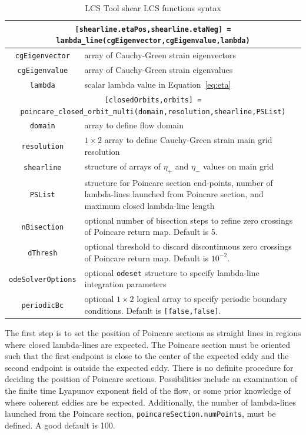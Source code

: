\documentclass{article}
\begin{document}
\begin{table}
\begin{tabular}{|c|p{}|}
\hline \hline
\multicolumn{2}{|p{\textwidth}|}{\lstinline![shearline.etaPos,shearline.etaNeg] = lambda_line(cgEigenvector,cgEigenvalue,lambda)!}\\
\hline
\lstinline!cgEigenvector! & array of Cauchy-Green strain eigenvectors\\
\hline
\lstinline!cgEigenvalue! & array of Cauchy-Green strain eigenvalues\\
\hline
\lstinline!lambda! & scalar lambda value in Equation~\eqref{eq:eta}\\
\hline \hline
\multicolumn{2}{|p{\textwidth}|}{\lstinline![closedOrbits,orbits] = poincare_closed_orbit_multi(domain,resolution,shearline,PSList)!}\\
\hline
\lstinline!domain! & array to define flow domain\\
\hline
\lstinline!resolution! & $1 \times 2$ array to define Cauchy-Green strain main grid resolution\\
\hline
\lstinline!shearline! & structure of arrays of $\eta_+$ and $\eta_-$ values on main grid\\
\hline
\lstinline!PSList! & structure for Poincare section end-points, number of lambda-lines launched from Poincare section, and maximum closed lambda-line length\\
\hline
\lstinline!nBisection! & optional number of bisection steps to refine zero crossings of Poincare return map. Default is 5.\\
\hline
\lstinline!dThresh! & optional threshold to discard discontinuous zero crossings of Poincare return map. Default is $10^{-2}$.\\
\hline
\lstinline!odeSolverOptions! & optional \lstinline!odeset! structure to specify lambda-line integration parameters\\
\hline
\lstinline!periodicBc! & optional $1 \times 2$ logical array to specify periodic boundary conditions. Default is \lstinline![false,false]!.\\
\hline \hline
\end{tabular}
\caption{LCS Tool shear LCS functions syntax}
\label{t:Shear LCS functions}
\end{table}

The first step is to set the position of Poincare sections as straight lines in regions where closed lambda-lines are expected. The Poincare section must be oriented such that the first endpoint is close to the center of the expected eddy and the second endpoint is outside the expected eddy. There is no definite procedure for deciding the position of Poincare sections. Possibilities include an examination of the finite time Lyapunov exponent field of the flow, or some prior knowledge of where coherent eddies are be expected. Additionally, the number of lambda-lines launched from the Poincare section, \lstinline!poincareSection.numPoints!, must be defined. A good default is 100.
\end{document}
